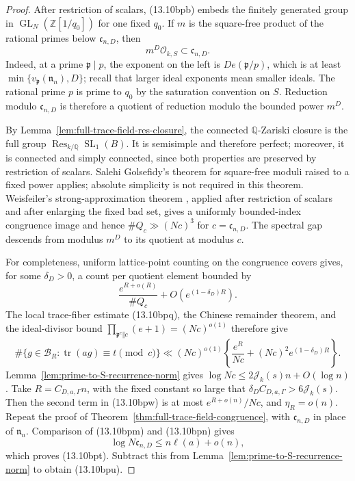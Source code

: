 \documentclass[11pt,reqno]{amsart}
\theoremstyle{definition}
\theoremstyle{remark}
\newcommand{\Q}{\mathbb Q}
\newcommand{\Z}{\mathbb Z}
\newcommand{\cO}{\mathcal O}
\newcommand{\Tr}{\operatorname{tr}}
\newcommand{\SL}{\operatorname{SL}}
\newcommand{\GL}{\operatorname{GL}}
\begin{document}
\begin{proof}
After restriction of scalars, (13.10bpb) embeds the finitely generated group
in \(\GL_N(\Z[1/q_0])\) for one fixed \(q_0\).  If
\(m\) is the square-free product of the rational primes below
\(\mathfrak c_{n,D}\), then
\[
 m^D\cO_{k,S}\subset\mathfrak c_{n,D}.
\tag{13.10bpv}
\]
Indeed, at a prime \(\mathfrak p\mid p\), the exponent on the left is
\(D e(\mathfrak p/p)\), which is at least
\(\min\{v_{\mathfrak p}(\mathfrak n_n),D\}\); recall that larger ideal
exponents mean smaller ideals.  The rational prime \(p\) is prime to
\(q_0\) by the saturation convention on \(S\).  Reduction modulo
\(\mathfrak c_{n,D}\) is therefore a quotient of reduction modulo the
bounded power \(m^D\).

By Lemma~\ref{lem:full-trace-field-res-closure}, the connected
\(\Q\)-Zariski closure is the full group
\(\operatorname{Res}_{k/\Q}\SL_1(B)\).  It is semisimple and therefore
perfect; moreover, it is connected and simply connected, since both
properties are preserved by restriction of scalars.  Salehi Golsefidy's
theorem for square-free moduli raised to a fixed power
\cite{SalehiSuperII} applies; absolute simplicity is not required in this
theorem.  Weisfeiler's strong-approximation theorem
\cite{WeisfeilerStrong}, applied after restriction of scalars and after enlarging
the fixed bad set, gives a uniformly bounded-index congruence image and hence
\(\#Q_c\gg(Nc)^3\) for \(c=\mathfrak c_{n,D}\).  The spectral gap
descends from modulus \(m^D\) to its quotient at modulus \(c\).

For completeness, uniform lattice-point counting on the congruence covers
gives, for some \(\delta_D>0\), a count per quotient element bounded by
\[
 \frac{e^{R+o(R)}}{\#Q_c}+O(e^{(1-\delta_D)R}).
\]
The local trace-fiber estimate (13.10bpq), the Chinese remainder theorem,
and the ideal-divisor bound
\(\prod_{\mathfrak p^e\Vert c}(e+1)=(Nc)^{o(1)}\) therefore give
\[
 \#\{g\in\mathcal B_R:\Tr(ag)\equiv t\pmod c\}
 \ll (Nc)^{o(1)}\left\{\frac{e^R}{Nc}
             +(Nc)^2e^{(1-\delta_D)R}\right\}.
\tag{13.10bpw}
\]
Lemma~\ref{lem:prime-to-S-recurrence-norm} gives
\(\log Nc\le2\mathcal J_k(s)n+O(\log n)\).  Take
\(R=C_{D,a,\Gamma}n\), with the fixed constant so large that
\(\delta_DC_{D,a,\Gamma}>6\mathcal J_k(s)\).  Then the second term in
(13.10bpw) is at most \(e^{R+o(n)}/Nc\), and \(\eta_R=o(n)\).
Repeat the proof of
Theorem~\ref{thm:full-trace-field-congruence}, with
\(\mathfrak c_{n,D}\) in place of \(\mathfrak n_n\).  Comparison of
(13.10bpm) and (13.10bpn) gives
\[
 \log N\mathfrak c_{n,D}\le n\ell(a)+o(n),
\]
which proves (13.10bpt).  Subtract this from
Lemma~\ref{lem:prime-to-S-recurrence-norm} to obtain (13.10bpu).
\end{proof}
\end{document}
